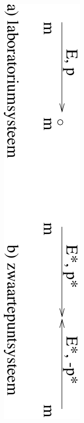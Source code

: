 \begin{figure}[ht]
\includegraphics[width=.8\textwidth]{oefeningen.pictures/productie}
\caption{}
\label{f:productie}
\end{figure}

